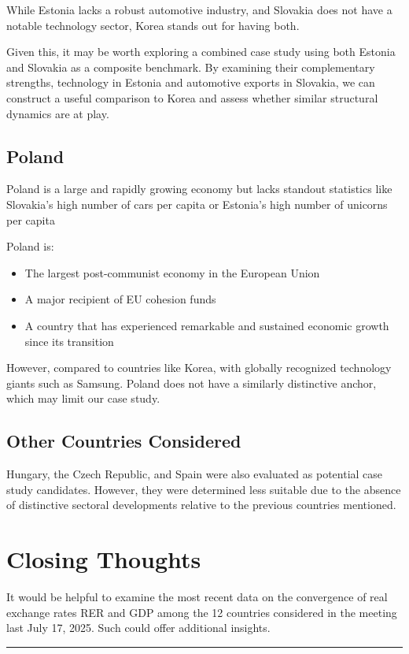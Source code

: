 \documentclass[
  11pt,
]{article}
\providecommand{\tightlist}{%
  \setlength{\itemsep}{0pt}\setlength{\parskip}{0pt}}
\begin{document}
While Estonia lacks a robust automotive industry, and Slovakia does not
have a notable technology sector, Korea stands out for having both.

Given this, it may be worth exploring a combined case study using both
Estonia and Slovakia as a composite benchmark. By examining their
complementary strengths, technology in Estonia and automotive exports in
Slovakia, we can construct a useful comparison to Korea and assess
whether similar structural dynamics are at play.

\subsection{Poland}\label{poland}

Poland is a large and rapidly growing economy but lacks standout
statistics like Slovakia's high number of cars per capita or Estonia's
high number of unicorns per capita

Poland is:

\begin{itemize}
\tightlist
\item
  The largest post-communist economy in the European Union\\
\item
  A major recipient of EU cohesion funds\\
\item
  A country that has experienced remarkable and sustained economic
  growth since its transition
\end{itemize}

However, compared to countries like Korea, with globally recognized
technology giants such as Samsung. Poland does not have a similarly
distinctive anchor, which may limit our case study.

\subsection{Other Countries
Considered}\label{other-countries-considered}

Hungary, the Czech Republic, and Spain were also evaluated as potential
case study candidates. However, they were determined less suitable due
to the absence of distinctive sectoral developments relative to the
previous countries mentioned.

\section{Closing Thoughts}\label{closing-thoughts}

It would be helpful to examine the most recent data on the convergence
of real exchange rates RER and GDP among the 12 countries considered in
the meeting last July 17, 2025. Such could offer additional insights.

\begin{center}\rule{0.5\linewidth}{0.5pt}\end{center}


\printbibliography
\end{document}
